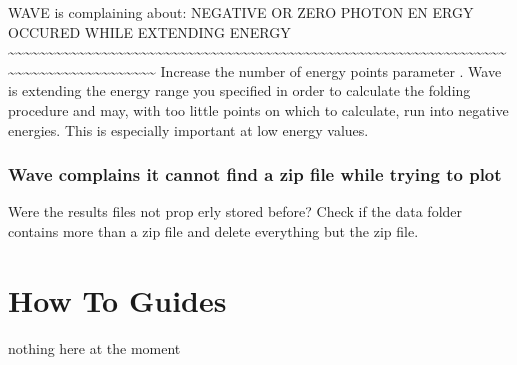 \documentclass[letterpaper,10pt,english]{sphinxmanual}
\begin{document}
\sphinxAtStartPar
WAVE is complaining about: NEGATIVE OR ZERO PHOTON EN\sphinxhyphen{}
ERGY OCCURED WHILE EXTENDING ENERGY
\textasciitilde{}\textasciitilde{}\textasciitilde{}\textasciitilde{}\textasciitilde{}\textasciitilde{}\textasciitilde{}\textasciitilde{}\textasciitilde{}\textasciitilde{}\textasciitilde{}\textasciitilde{}\textasciitilde{}\textasciitilde{}\textasciitilde{}\textasciitilde{}\textasciitilde{}\textasciitilde{}\textasciitilde{}\textasciitilde{}\textasciitilde{}\textasciitilde{}\textasciitilde{}\textasciitilde{}\textasciitilde{}\textasciitilde{}\textasciitilde{}\textasciitilde{}\textasciitilde{}\textasciitilde{}\textasciitilde{}\textasciitilde{}\textasciitilde{}\textasciitilde{}\textasciitilde{}\textasciitilde{}\textasciitilde{}\textasciitilde{}\textasciitilde{}\textasciitilde{}\textasciitilde{}\textasciitilde{}\textasciitilde{}\textasciitilde{}\textasciitilde{}\textasciitilde{}\textasciitilde{}\textasciitilde{}\textasciitilde{}\textasciitilde{}\textasciitilde{}\textasciitilde{}\textasciitilde{}\textasciitilde{}\textasciitilde{}\textasciitilde{}\textasciitilde{}\textasciitilde{}\textasciitilde{}\textasciitilde{}\textasciitilde{}\textasciitilde{}\textasciitilde{}\textasciitilde{}\textasciitilde{}\textasciitilde{}\textasciitilde{}\textasciitilde{}\textasciitilde{}\textasciitilde{}\textasciitilde{}\textasciitilde{}\textasciitilde{}\textasciitilde{}\textasciitilde{}\textasciitilde{}\textasciitilde{}\textasciitilde{}\textasciitilde{}\textasciitilde{}\textasciitilde{}\textasciitilde{}\textasciitilde{}
Increase the number of energy points \sphinxhyphen{} parameter .
Wave is extending the energy range you specified in order to calculate
the folding procedure and may, with too little points on which to
calculate, run into negative energies. This is especially important at
low energy values.


\subsection{Wave complains it cannot find a zip file while trying to plot}
\label{\detokenize{tutorial:wave-complains-it-cannot-find-a-zip-file-while-trying-to-plot}}
\sphinxAtStartPar
Were the results files not prop erly stored before?
Check if the data folder contains more than a zip file and
delete everything but the zip file.

\sphinxstepscope


\chapter{How To Guides}
\label{\detokenize{how_to:how-to-guides}}\label{\detokenize{how_to::doc}}
\sphinxAtStartPar
nothing here at the moment
\end{document}
